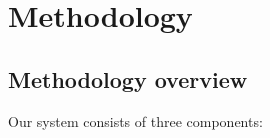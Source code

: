 \section*{Methodology}
\label{sec:methodology}
\subsection*{Methodology overview}
Our system consists of three components:
